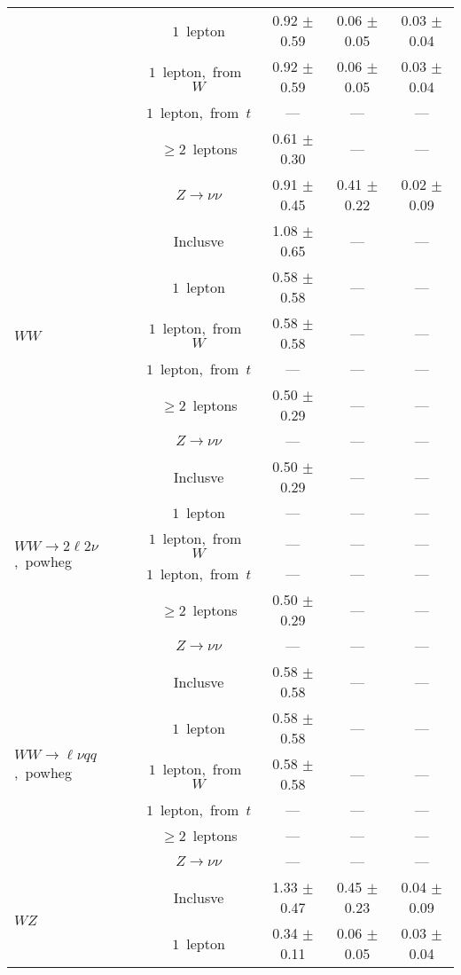 \documentclass{article}
\begin{document}
\begin{longtable}{|l|c|c|c|c|}
 & $1$~lepton  & 0.92 $\pm$ 0.59  & 0.06 $\pm$ 0.05  & 0.03 $\pm$ 0.04 \\* 
 & $1$~lepton,~from~$W$  & 0.92 $\pm$ 0.59  & 0.06 $\pm$ 0.05  & 0.03 $\pm$ 0.04 \\* 
 & $1$~lepton,~from~$t$  & ---  & ---  & --- \\* 
 & $\ge2$~leptons  & 0.61 $\pm$ 0.30  & ---  & --- \\* 
 & $Z\rightarrow\nu\nu$  & 0.91 $\pm$ 0.45  & 0.41 $\pm$ 0.22  & 0.02 $\pm$ 0.09 \\* 
\hline 
\multirow{6}{*}{$WW$} & Inclusve  & 1.08 $\pm$ 0.65  & ---  & --- \\* 
 & $1$~lepton  & 0.58 $\pm$ 0.58  & ---  & --- \\* 
 & $1$~lepton,~from~$W$  & 0.58 $\pm$ 0.58  & ---  & --- \\* 
 & $1$~lepton,~from~$t$  & ---  & ---  & --- \\* 
 & $\ge2$~leptons  & 0.50 $\pm$ 0.29  & ---  & --- \\* 
 & $Z\rightarrow\nu\nu$  & ---  & ---  & --- \\* 
\hline 
\multirow{6}{*}{$WW{\rightarrow}2\ell2\nu$,~powheg} & Inclusve  & 0.50 $\pm$ 0.29  & ---  & --- \\* 
 & $1$~lepton  & ---  & ---  & --- \\* 
 & $1$~lepton,~from~$W$  & ---  & ---  & --- \\* 
 & $1$~lepton,~from~$t$  & ---  & ---  & --- \\* 
 & $\ge2$~leptons  & 0.50 $\pm$ 0.29  & ---  & --- \\* 
 & $Z\rightarrow\nu\nu$  & ---  & ---  & --- \\* 
\hline 
\multirow{6}{*}{$WW{\rightarrow}{\ell}{\nu}qq$,~powheg} & Inclusve  & 0.58 $\pm$ 0.58  & ---  & --- \\* 
 & $1$~lepton  & 0.58 $\pm$ 0.58  & ---  & --- \\* 
 & $1$~lepton,~from~$W$  & 0.58 $\pm$ 0.58  & ---  & --- \\* 
 & $1$~lepton,~from~$t$  & ---  & ---  & --- \\* 
 & $\ge2$~leptons  & ---  & ---  & --- \\* 
 & $Z\rightarrow\nu\nu$  & ---  & ---  & --- \\* 
\hline 
\multirow{6}{*}{$WZ$} & Inclusve  & 1.33 $\pm$ 0.47  & 0.45 $\pm$ 0.23  & 0.04 $\pm$ 0.09 \\* 
 & $1$~lepton  & 0.34 $\pm$ 0.11  & 0.06 $\pm$ 0.05  & 0.03 $\pm$ 0.04 \\* 

\end{longtable}
\end{document}
